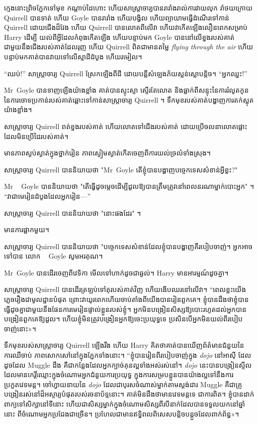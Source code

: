 {{{{ក្មេងនោះព្រិចភ្នែកទៅមុខ កណ្ដាប់ដៃហោះ ហើយសាស្រ្តាចារ្យបានរារាំងរាល់ការវាយលុក រាំថយក្រោយ Quirrell បានទាត់ ហើយ Goyle បានរារាំង ហើយបង្វិល ហើយព្យាយាមធ្វើដំណើរទៅកាន់ Quirrell ដោយជើងដ៏វែង ហើយ Quirrell បានលោតពីលើវា ហើយវាកើតឡើងលឿនពេកសម្រាប់ Harry ដើម្បី យល់ពីអ្វីដែលកំពុងកើតឡើង ហើយបន្ទាប់មក Goyle បាននៅលើខ្នងរបស់គាត់ជាមួយនឹងជើងរបស់គាត់ដែលរុញ ហើយ Quirrell ពិតជាមានតម្លៃ \emph{flying through the air} ហើយបន្ទាប់មកគាត់បានវាយទៅលើស្មាដីដំបូង ហើយរមៀល។

“ឈប់!” សាស្ត្រាចារ្យ Quirrell ស្រែក​ឡើង​ពី​ដី ដោយ​បន្លឺ​សំឡេង​ភ័យ​ស្លន់ស្លោ​បន្តិច។ “អ្នកឈ្នះ!”

Mr~Goyle បានទាញឡើងយ៉ាងខ្លាំង គាត់បានស្ទុះស្ទា ស្ទើរតែលោត និងធ្លាក់ពីសន្ទុះនៃការរំលូតកូន នៃការចោទប្រកាន់របស់គាត់ឆ្ពោះទៅកាន់សាស្រ្តាចារ្យ Quirrell ។ ទឹកមុខរបស់គាត់បង្ហាញការតក់ស្លុតយ៉ាងខ្លាំង។

សាស្ត្រាចារ្យ Quirrell ពត់ខ្នងរបស់គាត់ ហើយលោតទៅជើងរបស់គាត់ ដោយប្រើចលនាលោតផ្លោះ ដែលមិនប្រើដៃរបស់គាត់។

មានភាពស្ងប់ស្ងាត់ក្នុងថ្នាក់រៀន ភាពស្ងៀមស្ងាត់កើតចេញពីការយល់ច្រលំទាំងស្រុង។

សាស្ត្រាចារ្យ Quirrell បាននិយាយថា "Mr~Goyle តើខ្ញុំបានបង្ហាញបច្ចេកទេសសំខាន់អ្វីខ្លះ?"

Mr ~ Goyle បាននិយាយថា "តើធ្វើដូចម្តេចដើម្បីដួលឱ្យបានត្រឹមត្រូវនៅពេលនរណាម្នាក់បោះអ្នក" ។ “វាជាមេរៀនដំបូងដែលអ្នករៀន—”

សាស្រ្តាចារ្យ Quirrell បាននិយាយថា "នោះផងដែរ" ។

មានការផ្អាកមួយ។

សាស្រ្តាចារ្យ Quirrell បាននិយាយថា "បច្ចេកទេសសំខាន់ដែលខ្ញុំបានបង្ហាញគឺរបៀបចាញ់។ អ្នកអាចទៅបាន លោក ~ Goyle សូមអរគុណ។

Mr~Goyle បានដើរចេញពីវេទិកា មើលទៅហាក់ដូចជាឆ្ងល់។ Harry មាន​អារម្មណ៍​ដូច​គ្នា។

សាស្ត្រាចារ្យ Quirrell បានដើរត្រឡប់ទៅតុរបស់គាត់វិញ ហើយងើបឈរនៅលើវា។ “ពេលខ្លះយើងភ្លេចរឿងជាមូលដ្ឋានបំផុត ព្រោះវាយូរពេកហើយចាប់តាំងពីយើងបានរៀនពួកគេ។ ខ្ញុំបានដឹងថាខ្ញុំបានធ្វើដូចគ្នាជាមួយនឹងផែនការមេរៀនផ្ទាល់ខ្លួនរបស់ខ្ញុំ។ អ្នកមិនបង្រៀនសិស្សឱ្យបោះរហូតដល់អ្នកបានបង្រៀនពួកគេឱ្យដួល។ ហើយ​ខ្ញុំ​មិន​ត្រូវ​បង្រៀន​អ្នក​ឱ្យ​ចេះ​ប្រយុទ្ធ​ទេ ប្រសិន​បើ​អ្នក​មិន​យល់​ពី​របៀប​ចាញ់​នោះ»។

ទឹកមុខរបស់សាស្រ្តាចារ្យ Quirrell ឡើងរឹង ហើយ Harry គិតថាគាត់បានឃើញព័ត៌មានជំនួយនៃការឈឺចាប់ ភាពសោកសៅនៅក្នុងភ្នែកទាំងនោះ។ “ខ្ញុំបានរៀនពីរបៀបចាញ់ក្នុង \emph{dojo} នៅអាស៊ី ដែលដូចដែល Muggle ដឹង គឺជាកន្លែងដែលអ្នកក្បាច់គុនល្អទាំងអស់រស់នៅ។ \emph{dojo} នេះបានបង្រៀនស្ទីលដែលមានកេរ្តិ៍ឈ្មោះក្នុងចំណោមអ្នកជំនួយការប្រយុទ្ធ ក្នុងការសម្របខ្លួនបានយ៉ាងល្អទៅនឹងការប្រកួតវេទមន្ត។ ចៅហ្វាយនាយនៃ \emph{dojo} ដែលជាបុរសចំណាស់ម្នាក់តាមស្តង់ដារ Muggle គឺជាគ្រូបង្រៀនរស់នៅដ៏អស្ចារ្យបំផុតរបស់រចនាប័ទ្មនោះ។ គាត់មិនដឹងថាមានវេទមន្តទេ ជាការពិត។ ខ្ញុំ​បាន​ដាក់ពាក្យ​ទៅ​សិក្សា​នៅ​ទីនោះ ហើយ​ជា​សិស្ស​ម្នាក់​ក្នុង​ចំណោម​សិស្ស​ពីរ​បី​នាក់​ដែល​បាន​ទទួល​យក​នៅ​ឆ្នាំ​នោះ ពី​ចំណោម​អ្នក​ប្រជែង​ជា​ច្រើន។ ប្រហែល​ជា​មាន​ឥទ្ធិពល​ពិសេស​បន្តិច​បន្តួច​ដែល​ពាក់ព័ន្ធ»។

}}}}
